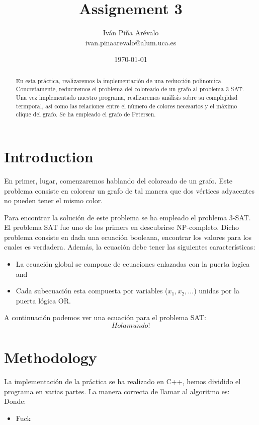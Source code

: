 \documentclass{article}
\title{Assignement 3}
\author{Iván Piña Arévalo \\ ivan.pinaarevalo@alum.uca.es}
\date{\today}
\begin{document}
\maketitle

\newpage
\begin{abstract}
    En esta práctica, realizaremos la implementación de una reducción polinomica. 
    Concretamente, reduciremos el problema del coloreado de un grafo al problema
    3-SAT. Una vez implementado nuestro programa, realizaremos análisis sobre su 
    complejidad termporal, así como las relaciones entre el número de colores 
    necesarios y el máximo clique del grafo. Se ha empleado el grafo de Petersen.
\end{abstract}

\newpage

\section{Introduction}
    En primer, lugar, comenzaremos hablando del coloreado de un grafo. Este problema
    consiste en colorear un grafo de tal manera que dos vértices adyacentes no pueden 
    tener el mismo color. 

    Para encontrar la solución de este problema se ha empleado el problema 3-SAT. 
    El problema SAT fue uno de los primers en descubrirse NP-completo. Dicho problema consiste 
    en dada una ecuación booleana, encontrar los valores para los cuales es verdadera. Además, la 
    ecuación debe tener las siguientes características: 
    \begin{itemize}
        \item La ecuación global se compone de ecuaciones enlazadas con la puerta logica and
        \item Cada subecuación esta compuesta por variables ($x_1, x_2, ...$) unidas por la puerta lógica OR.
    \end{itemize}

    A continuación podemos ver una ecuación para el problema SAT:
        \[Hola mundo!\]

    

\section{Methodology}
    La implementación de la práctica se ha realizado en C++, hemos dividido el programa en varias partes. La manera correcta
    de llamar al algoritmo es: 
        \[\]
    Donde:
    \begin{itemize}
        \item Fuck
    \end{itemize}
\end{document}
